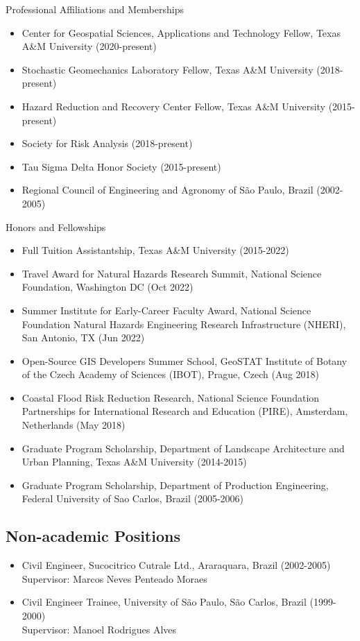\documentclass[11pt,oneside]{article}
\begin{document}
\vspace{3pt}

{Professional Affiliations and Memberships}
\begin{itemize}[leftmargin=20pt]
\item Center for Geospatial Sciences, Applications and Technology Fellow, Texas A\&M University (2020-present)
\item Stochastic Geomechanics Laboratory Fellow, Texas A\&M University (2018-present)
\item Hazard Reduction and Recovery Center Fellow, Texas A\&M University (2015-present)
\item Society for Risk Analysis (2018-present)
\item Tau Sigma Delta Honor Society (2015-present)
\item Regional Council of Engineering and Agronomy of São Paulo, Brazil (2002-2005)
\end{itemize}

\newpage

{Honors and Fellowships}
\begin{itemize}[leftmargin=20pt]
\item {Full Tuition Assistantship}, Texas A\&M University (2015-2022)
\item {Travel Award for Natural Hazards Research Summit}, National Science Foundation, Washington DC (Oct 2022)
\item {Summer Institute for Early-Career Faculty Award}, National Science Foundation Natural Hazards Engineering Research Infrastructure (NHERI), San Antonio, TX (Jun 2022)
\item {Open-Source GIS Developers Summer School}, GeoSTAT Institute of Botany of the Czech Academy of Sciences (IBOT), Prague, Czech (Aug 2018)
\item {Coastal Flood Risk Reduction Research}, National Science Foundation Partnerships for International Research and Education (PIRE), Amsterdam, Netherlands (May 2018)
\item {Graduate Program Scholarship}, Department of Landscape Architecture and Urban Planning, Texas A\&M University (2014-2015)
\item {Graduate Program Scholarship}, Department of Production Engineering, Federal University of Sao Carlos, Brazil (2005-2006)
\end{itemize}

\subsection*{Non-academic Positions}
\begin{itemize}[leftmargin=20pt]
\item Civil Engineer, Sucocitrico Cutrale Ltd., Araraquara, Brazil (2002-2005)\\
      Supervisor: Marcos Neves Penteado Moraes
\item Civil Engineer Trainee, University of São Paulo, São Carlos, Brazil (1999-2000)\\
      Supervisor: Manoel Rodrigues Alves
\end{itemize}
\end{document}
